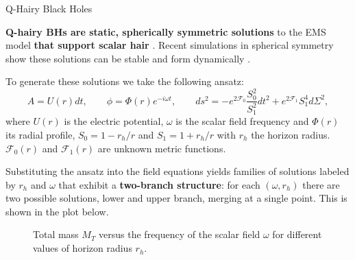 \begin{block}{Q-Hairy Black Holes}

\textbf{Q-hairy \glspl{BH} are static, spherically symmetric solutions} to the \gls{EMS} model \textbf{that support scalar hair} \cite{Herdeiro2020}. Recent simulations in spherical symmetry show these solutions can be stable and form dynamically \cite{Zhang2023}.

To generate these solutions we take the following ansatz:
%
\begin{equation}
    A = U(r) dt, \qquad \phi = \Phi(r) e^{-i \omega t}, \qquad ds^2 = -e^{2\mathcal{F}_0} \frac{S_0^2}{S_1^2} dt^2 + e^{2\mathcal{F}_1} S_1^4 d\Sigma^2,
\end{equation}
%
where $U(r)$ is the electric potential, $\omega$ is the scalar field frequency and $\Phi(r)$ its radial profile, $S_0 = 1 - r_h/r$ and $S_1 = 1 + r_h/r$ with $r_h$ the horizon radius. $\mathcal{F}_0(r)$ and $\mathcal{F}_1(r)$ are unknown metric functions.

Substituting the ansatz into the field equations yields families of solutions labeled by $r_h$ and $\omega$ that exhibit a \textbf{two-branch structure}: for each $(\omega, r_h)$ there are two possible solutions, lower and upper branch, merging at a single point. This is shown in the plot below.

\begin{figure}[h!]
    \centering
    
    \caption{Total mass $M_T$ versus the frequency of the scalar field $\omega$ for different values of horizon radius $r_h$.}
\end{figure}

\vspace{-1.25em}  %

\end{block}
